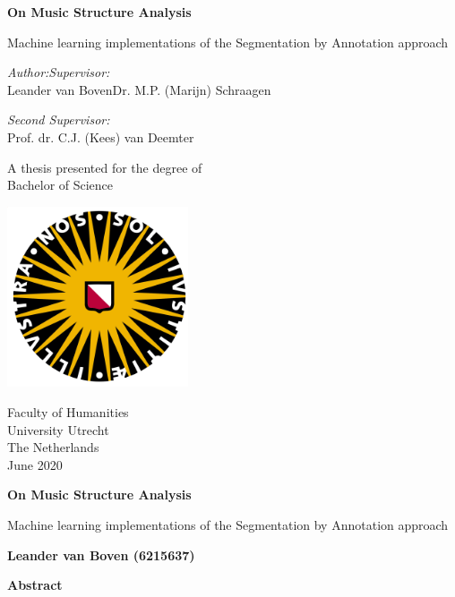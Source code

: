 \documentclass[12pt]{report} %
\theoremstyle{definition}
\begin{document}
\begin{titlepage}
    \begin{center}
        \vspace*{1cm}

        \Huge
        \textbf{On Music Structure Analysis}

        \vspace{0.5cm}
        \LARGE
        Machine learning implementations of the Segmentation by Annotation approach

        \vspace{1.5cm}
    \end{center}
    \large
    \textit{Author:}\hfill\textit{Supervisor:} \\
        Leander van Boven\hfill Dr. M.P. (Marijn) Schraagen
        \begin{flushright}
            \textit{Second Supervisor:} \\
            Prof. dr. C.J. (Kees) van Deemter \\
        \end{flushright}

    \vfill
    \begin{center}
        A thesis presented for the degree of\\
        Bachelor of Science

        \vspace{0.8cm}

        \href{https://www.uu.nl/bachelors/kunstmatige-intelligentie}{\includegraphics[width=0.4\textwidth]{images/uu_logo}}
    
        \Large
        Faculty of Humanities\\
        University Utrecht\\
        The Netherlands\\
        June 2020
    \end{center}
\end{titlepage}

\thispagestyle{plain}
\begin{center}
    \Large
    \textbf{On Music Structure Analysis}

    \vspace{0.4cm}
    \large
    Machine learning implementations of the Segmentation by Annotation approach

    \vspace{0.4cm}
    \textbf{Leander van Boven (6215637)}

    \vspace{0.9cm}
    \textbf{Abstract}
\end{center}

\end{document}
